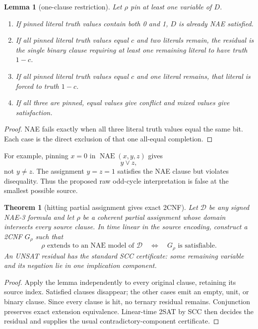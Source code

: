 \documentclass[11pt]{article}
\newtheorem{theorem}{Theorem}
\newtheorem{lemma}{Lemma}
\begin{document}
\begin{lemma}[one-clause restriction]
Let $\rho$ pin at least one variable of $D$.
\begin{enumerate}
\item If pinned literal truth values contain both 0 and 1, $D$ is already NAE
satisfied.
\item If all pinned literal truth values equal $c$ and two literals remain,
the residual is the single binary clause requiring at least one remaining
literal to have truth $1-c$.
\item If all pinned literal truth values equal $c$ and one literal remains,
that literal is forced to truth $1-c$.
\item If all three are pinned, equal values give conflict and mixed values give
satisfaction.
\end{enumerate}
\end{lemma}
\begin{proof}
NAE fails exactly when all three literal truth values equal the same bit.
Each case is the direct exclusion of that one all-equal completion.
\end{proof}

For example, pinning $x=0$ in $\operatorname{NAE}(x,y,z)$ gives
\[
 y\vee z,
\]
not $y\ne z$.  The assignment $y=z=1$ satisfies the NAE clause but violates
disequality.  Thus the proposed raw odd-cycle interpretation is false at the
smallest possible source.

\begin{theorem}[hitting partial assignment gives exact 2CNF]
Let $\mathcal D$ be any signed NAE-3 formula and let $\rho$ be a coherent
partial assignment whose domain intersects every source clause.  In time
linear in the source encoding, construct a 2CNF $G_\rho$ such that
\[
 \rho\text{ extends to an NAE model of }\mathcal D
 \quad\Longleftrightarrow\quad
 G_\rho\text{ is satisfiable}.
\]
An UNSAT residual has the standard SCC certificate: some remaining variable
and its negation lie in one implication component.
\end{theorem}
\begin{proof}
Apply the lemma independently to every original clause, retaining its source
index.  Satisfied clauses disappear; the other cases emit an empty, unit, or
binary clause.  Since every clause is hit, no ternary residual remains.
Conjunction preserves exact extension equivalence.  Linear-time 2SAT by SCC
then decides the residual and supplies the usual contradictory-component
certificate.
\end{proof}
\end{document}
